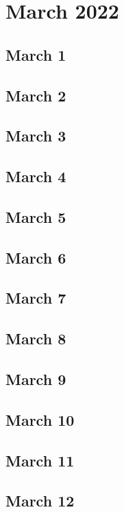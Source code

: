 \chapter{March 2022}

\section{March 1}

\section{March 2}

\section{March 3}

\section{March 4}

\section{March 5}

\section{March 6}

\section{March 7}

\section{March 8}

\section{March 9}

\section{March 10}

\section{March 11}

\section{March 12}

